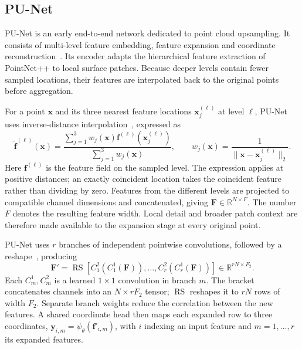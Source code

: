 \subsection{PU-Net}
\label{subsec:punet}

PU-Net is an early end-to-end network dedicated to point cloud upsampling.
It consists of multi-level feature embedding, feature expansion and
coordinate reconstruction~\cite{yu2018punet}. Its encoder adapts the
hierarchical feature extraction of PointNet++ to local surface patches.
Because deeper levels contain fewer sampled locations, their features are
interpolated back to the original points before aggregation.

For a point $\mathbf x$ and its three nearest feature locations
$\mathbf x_j^{(\ell)}$ at level $\ell$, PU-Net uses inverse-distance
interpolation~\cite{yu2018punet}, expressed as
\begin{equation}
 \tilde{\mathbf f}^{(\ell)}(\mathbf x)=
 \frac{\sum_{j=1}^3 w_j(\mathbf x)\mathbf f^{(\ell)}(\mathbf x_j^{(\ell)})}
 {\sum_{j=1}^3w_j(\mathbf x)},\qquad
 w_j(\mathbf x)=\frac1{\|\mathbf x-\mathbf x_j^{(\ell)}\|_2}.
 \label{eq:punet_interpolation}
\end{equation}
Here $\mathbf f^{(\ell)}$ is the feature field on the sampled level.
The expression applies at positive distances; an exactly coincident
location takes the coincident feature rather than dividing by zero.
Features from the different levels are projected to compatible channel
dimensions and concatenated, giving
$\mathbf F\in\mathbb R^{N\times F}$. The number $F$ denotes the resulting
feature width. Local detail and broader patch context are therefore made
available to the expansion stage at every original point.

PU-Net uses $r$ branches of independent pointwise convolutions, followed
by a reshape~\cite{yu2018punet}, producing
\begin{equation}
 \mathbf F'=\operatorname{RS}\left[
 C_1^2(C_1^1(\mathbf F)),\ldots,C_r^2(C_r^1(\mathbf F))\right]
 \in\mathbb R^{rN\times F_2}.
 \label{eq:punet_expansion}
\end{equation}
Each $C_m^1,C_m^2$ is a learned $1\times1$ convolution in branch $m$.
The bracket concatenates channels into an $N\times rF_2$ tensor;
$\operatorname{RS}$ reshapes it to $rN$ rows of width $F_2$.
Separate branch weights reduce the correlation between the new features.
A shared coordinate head then maps each expanded row to three coordinates,
$\mathbf y_{i,m}=\psi_\theta(\mathbf f'_{i,m})$, with $i$ indexing
an input feature and $m=1,\ldots,r$ its expanded features.

